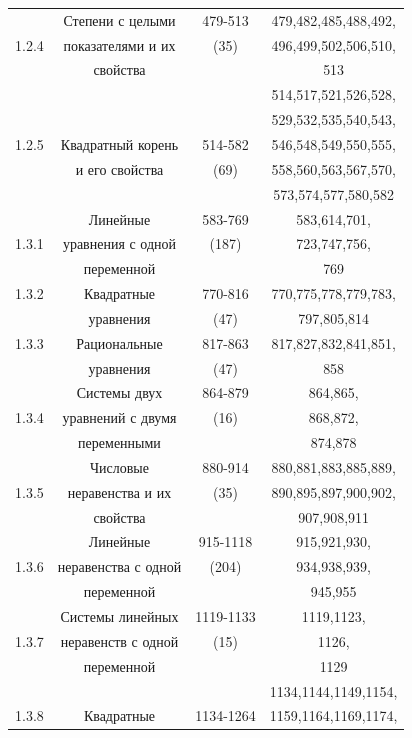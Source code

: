 \begin{table}[H]
\begin{center}
\begin{tabular}{|c|c|c|c|}
\hline
~ & Степени с целыми & 479-513 & 479,482,485,488,492,\\
1.2.4 & показателями и их & (35) & 496,499,502,506,510,\\
~ & свойства & ~ & 513\\
\hline
~ & ~ & ~ & 514,517,521,526,528,\\
~ & ~ & ~ & 529,532,535,540,543,\\
1.2.5 & Квадратный корень & 514-582 & 546,548,549,550,555,\\
~ & и его свойства & (69) & 558,560,563,567,570,\\
~ & ~ & ~ & 573,574,577,580,582\\
\hline
~ & Линейные & 583-769 & 583,614,701,\\
1.3.1 & уравнения с одной & (187) & 723,747,756,\\
~ & переменной & ~ & 769\\
\hline
1.3.2 & Квадратные & 770-816 & 770,775,778,779,783,\\
~ & уравнения & (47) & 797,805,814\\
\hline
1.3.3 & Рациональные & 817-863 & 817,827,832,841,851,\\
~ & уравнения & (47) & 858\\
\hline
~ & Системы двух & 864-879 & 864,865,\\
1.3.4 & уравнений с двумя & (16) & 868,872,\\
~ & переменными & ~ & 874,878\\
\hline
~ & Числовые & 880-914 & 880,881,883,885,889,\\
1.3.5 & неравенства и их & (35) & 890,895,897,900,902,\\
~ & свойства & ~ & 907,908,911\\
\hline
~ & Линейные & 915-1118 & 915,921,930,\\
1.3.6 & неравенства с одной & (204) & 934,938,939,\\
~ & переменной & ~ & 945,955\\
\hline
~ & Системы линейных & 1119-1133 & 1119,1123,\\
1.3.7 & неравенств с одной & (15) & 1126,\\
~ & переменной & ~ & 1129\\
\hline
~ & ~ & ~ & 1134,1144,1149,1154,\\
1.3.8 & Квадратные & 1134-1264 & 1159,1164,1169,1174,\\

\end{tabular}
\end{center}
\end{table}
